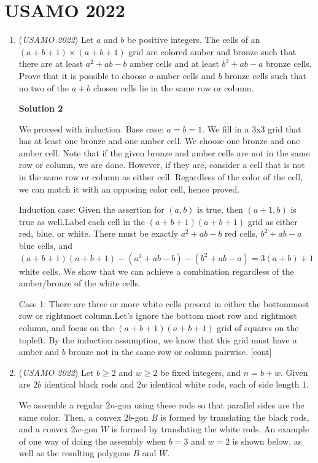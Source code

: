 \section{USAMO 2022}
        \begin{enumerate}
        	\item (\textit{USAMO 2022}) Let $a$ and $b$ be positive integers. The cells of an $(a+b+1)\times (a+b+1)$ grid are colored amber and bronze such that there are at least $a^2+ab-b$ amber cells and at least $b^2+ab-a$ bronze cells. Prove that it is possible to choose $a$ amber cells and $b$ bronze cells such that no two of the $a+b$ chosen cells lie in the same row or column.


 



\textbf{Solution 2}

We proceed with induction. Base case: $a=b=1$. We fill in a 3x3 grid that has at least one bronze and one amber cell. We choose one bronze and one amber cell. Note that if the given bronze and amber cells are not in the same row or column, we are done. However, if they are, consider a cell that is not in the same row or column as either cell. Regardless of the color of the cell, we can match it with an opposing color cell, hence proved. 

 Induction case: Given the assertion for $(a, b)$ is true, then $(a+1, b)$ is true as well.Label each cell in the $(a+b+1)(a+b+1)$ grid as either red, blue, or white. There must be exactly $a^2+ab-b$ red cells, $b^2+ab-a$ blue cells, and $(a+b+1)(a+b+1)-(a^2+ab-b)-(b^2+ab-a) = 3(a+b) + 1$ white cells. We show that we can achieve a combination regardless of the amber/bronze of the white cells.

 Case 1: There are three or more white cells present in either the bottommost row or rightmost column.Let's ignore the bottom most row and rightmost column, and focus on the $(a+b+1)(a+b+1)$ grid of squares on the topleft. By the induction assumption, we know that this grid must have $a$ amber and $b$ bronze not in the same row or column pairwise. [cont]

 


	\item (\textit{USAMO 2022}) Let $b\geq2$ and $w\geq2$ be fixed integers, and $n=b+w$. Given are $2b$ identical black rods and $2w$ identical white rods, each of side length 1.


 We assemble a regular $2n$-gon using these rods so that parallel sides are the same color. Then, a convex $2b$-gon $B$ is formed by translating the black rods, and a convex $2w$-gon $W$ is formed by translating the white rods. An example of one way of doing the assembly when $b=3$ and $w=2$ is shown below, as well as the resulting polygons $B$ and $W$.



\end{enumerate}
